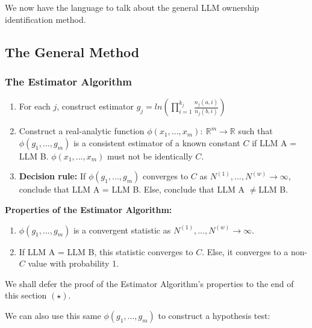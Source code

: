 \documentclass{article}
\begin{document}
We now have the language to talk about the general LLM ownership identification method.



\subsection{The General Method}

\subsubsection{The Estimator Algorithm}
\begin{enumerate}
\item For each $\displaystyle j$, construct estimator $\displaystyle g_{j} =ln\left(\prod _{i=1}^{k_{j}}\frac{n_{j}\left( a,i\right)}{n_{j}\left( b,i\right)}\right)$
\item Construct a real-analytic function $\displaystyle \phi \left( x_{1} ,...,x_{m}\right) :\ \mathbb{R}^{m}\rightarrow \mathbb{R}$ such that $\displaystyle \phi \left( g_{1} ,...,g_{m}\right)$ is a consistent estimator of a known constant $\displaystyle C$ if LLM A = LLM B. $\displaystyle \phi \left( x_{1} ,...,x_{m}\right)$ must not be identically $\displaystyle C$.
\item \textbf{Decision rule:} If $\displaystyle \phi \left( g_{1} ,...,g_{m}\right)$ converges to $\displaystyle C$ as $\displaystyle N^{\left( 1\right)} ,...,N^{\left( w\right)}\rightarrow \infty $, conclude that LLM A = LLM B. Else, conclude that LLM A $\displaystyle \neq $LLM B.
\end{enumerate}



\textbf{Properties of the Estimator Algorithm:}
\begin{enumerate}
\item  $\displaystyle \phi \left( g_{1} ,...,g_{m}\right)$ is a convergent statistic as $\displaystyle N^{\left( 1\right)} ,...,N^{\left( w\right)}\rightarrow \infty $.
\item If LLM A = LLM B, this statistic converges to $\displaystyle C$. Else, it converges to a non-$\displaystyle C$ value with probability 1.
\end{enumerate}

We shall defer the proof of the Estimator Algorithm's properties to the end of this section $\displaystyle \left( \star \right)$.



We can also use this same $\displaystyle \phi \left( g_{1} ,...,g_{m}\right)$ to construct a hypothesis test:
\end{document}
